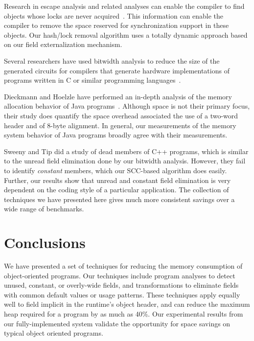 \documentclass{acmconf}
\begin{document}
Research in escape analysis and related analyses can enable the
compiler to find objects whose locks are never 
acquired~\cite{ACSE99,BH99,WR99:OOPSLA99,CGSSM99,Ruf00:PLDI00,SR01:PPOPP01}.
This information can enable the compiler to remove the space
reserved for synchronization support in these objects. 
Our hash/lock removal algorithm uses a totally dynamic approach
based on our field externalization mechanism. 

Several researchers have used bitwidth analysis to reduce the size
of the generated circuits for compilers that generate hardware
implementations of programs written in C or similar programming 
languages~\cite{ananian:siliconc,RR00:PLDI00,SBA00:PLDI00,BGSW00}.

Dieckmann and Hoelzle have performed an in-depth analysis of the
memory allocation behavior of Java programs~\cite{DH99}. Although 
space is not their primary focus, their study does quantify 
the space overhead associated the use of a two-word header
and of 8-byte alignment. In general, our measurements of the 
memory system behavior of Java programs broadly agree with their
measurements. 

Sweeny and Tip \cite{SweeneyTip98DeadDataMembers} did a study of dead
members of C++ programs, which is similar to the unread field
elimination done by our bitwidth analysis.  However, they
fail to identify {\it constant} members, which our SCC-based algorithm
does easily.  Further, our results show that unread and constant field
elimination is very dependent on the coding style of a particular
application.  The collection of techniques we have presented here
gives much more consistent savings over a wide range of benchmarks.



\section{Conclusions}

We have presented a set of techniques for reducing the memory
consumption of object-oriented programs.  Our techniques include
program analyses to detect unused, constant, or overly-wide fields,
and transformations to eliminate fields with common default values
or usage patterns.  These techniques apply equally well to
field implicit in the runtime's object header, and can reduce the
maximum heap required for a program by as much as 40\%. 
Our experimental results from our fully-implemented system validate the
opportunity for space savings on typical object oriented programs.



%
\end{document}
